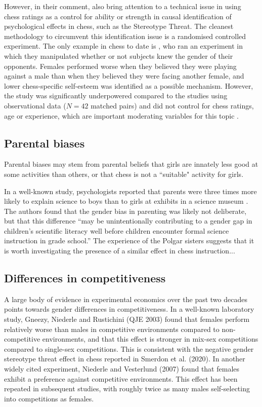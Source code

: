 However, in their comment, \cite{smerdon2020female} also bring attention to a technical issue in using chess ratings as a control for ability or strength in causal identification of psychological effects in chess, such as the Stereotype Threat. The cleanest methodology to circumvent this identification issue is a randomised controlled experiment. The only example in chess to date is \citep{Maass2007EuropeanJSocialPsych}, who ran an experiment in which they manipulated whether or not subjects knew the gender of their opponents. Females performed worse when they believed they were playing against a male than when they believed they were facing another female, and lower chess-specific self-esteem was identified as a possible mechanism. However, the study was significantly underpowered compared to the studies using observational data ($N=42$ matched pairs) and did not control for chess ratings, age or experience, which are important moderating variables for this topic \citep{smerdon2020female}. 




\subsection*{Parental biases}
Parental biases may stem from parental beliefs that girls are innately less good at some activities than others, or that chess is not a ``suitable" activity for girls.

In a well-known study, psychologists reported that parents were three times more likely to
explain science to boys than to girls at exhibits in a science museum \cite{Crowley2001PsySci}. The authors found that the gender bias in parenting was likely not deliberate, but that this difference ``may be unintentionally contributing to a gender gap in children’s scientific literacy well before children encounter formal science instruction in grade school.'' The experience of the Polgar sisters suggests that it is worth investigating the presence of a similar effect in chess instruction... 



\subsection*{Differences in competitiveness}
 A large body of evidence in experimental economics over the past two decades points towards gender differences in competitiveness. In a well-known laboratory study, Gneezy, Niederle and Rustichini (QJE 2003) found that females perform relatively worse than males in competitive environments compared to non-competitive environments, and that this effect is stronger in mix-sex competitions compared to single-sex competitions. This is consistent with the negative gender stereotype threat effect in chess reported in Smerdon et al. (2020). In another widely cited experiment, Niederle and Vesterlund (2007) found that females exhibit a preference against competitive environments. This effect has been repeated in subsequent studies, with roughly twice as many males self-selecting into competitions as females. 

